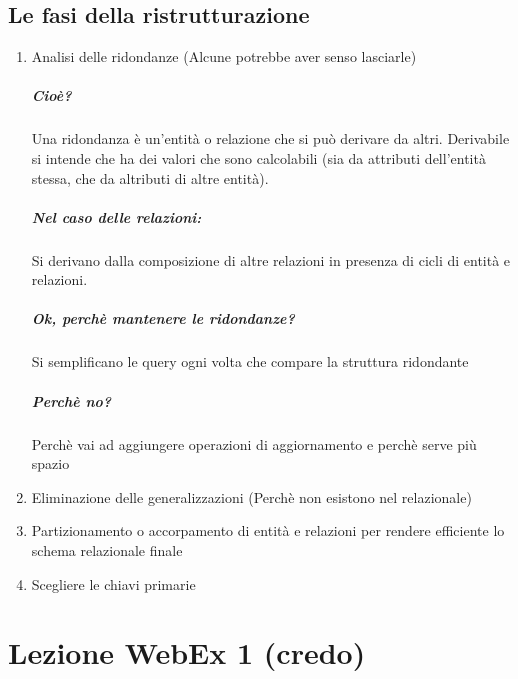 \documentclass[12pt, a4paper, openany, twoside]{book}
\begin{document}
\section{Le fasi della ristrutturazione}
\begin{enumerate}
	\item Analisi delle ridondanze (Alcune potrebbe aver senso lasciarle)
	\paragraph{Cioè?} Una ridondanza è un'entità o relazione che si può derivare
	da altri. Derivabile si intende che ha dei valori che sono calcolabili 
	(sia da attributi dell'entità stessa, che da altributi di altre entità).
	\paragraph{Nel caso delle relazioni:} Si derivano dalla composizione di 
	altre relazioni in presenza di cicli di entità e relazioni.
	\paragraph{Ok, perchè mantenere le ridondanze?} Si semplificano le query ogni
	volta che compare la struttura ridondante
	\paragraph{Perchè no?} Perchè vai ad aggiungere operazioni di aggiornamento e
	perchè serve più spazio
	\item Eliminazione delle generalizzazioni (Perchè non esistono nel relazionale)
	\item Partizionamento o accorpamento di entità e relazioni per rendere
	efficiente lo schema relazionale finale
	\item Scegliere le chiavi primarie
\end{enumerate}



























\chapter{Lezione WebEx 1 (credo)}
\end{document}
